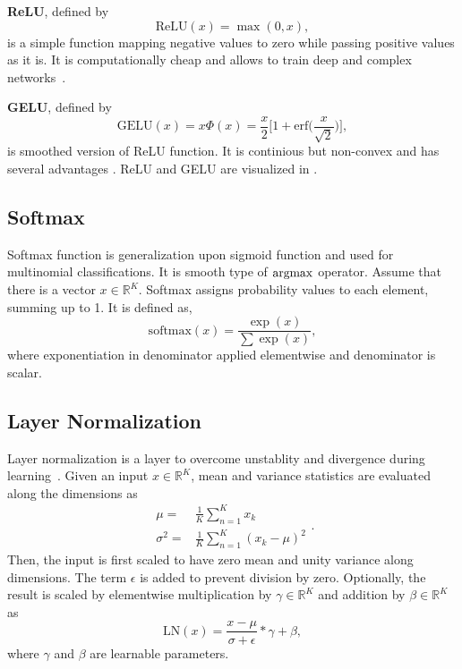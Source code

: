 \textbf{ReLU}, defined by
\begin{equation}
\label{eqn:relu_fcn}
\textrm{ReLU}(x) = \max(0, x),
\end{equation}
is a simple function mapping negative values to zero while passing positive values as it is. It is computationally cheap and allows to train deep and complex networks~\cite{glorot_deep_2011}.

\textbf{GELU}, defined by
\begin{equation}
\label{eqn:gelu_fcn}
\textrm{GELU}(x) = x \Phi(x) = \frac{x}{2} \bigg[ 1 + \textrm{erf} \Big( \frac{x}{\sqrt{2}} \Big) \bigg],
\end{equation}
is smoothed version of ReLU function. It is continious but non-convex and has several advantages \cite{hendrycks_gaussian_2020}. ReLU and GELU are visualized in  . 

\subsection{Softmax}

Softmax function is generalization upon sigmoid function and used for multinomial classifications. It is smooth type of $\operatorname{\textup{argmax}}$ operator. Assume that there is a vector $x \in \mathbb{R}^K$. Softmax assigns probability values to each element, summing up to 1. It is defined as,
\begin{equation}
\label{eqn:softmax_fcn}
\text{softmax}(x) = \frac{\exp(x)}{\sum \exp(x)},
\end{equation}
where exponentiation in denominator applied elementwise and denominator is scalar.

\subsection{Layer Normalization}

Layer normalization is a layer to overcome unstablity and divergence during learning~\cite{ba_layer_2016}. 
Given an input $x \in \mathbb{R}^K$, mean and variance statistics are evaluated along the dimensions as  
\begin{equation}
\label{eq:layernorm_statistics}
\begin{split}
\mu = & \frac{1}{K} \sum_{n=1}^{K} x_k \\
\sigma^2 = & \frac{1}{K} \sum_{n=1}^{K} (x_k-\mu)^2
\end{split}.
\end{equation} 
Then, the input is first scaled to have zero mean and unity variance along dimensions. 
The term $\epsilon$ is added to prevent division by zero. 
Optionally, the result is scaled by elementwise multiplication by $\gamma \in \mathbb{R}^K$ and addition by $\beta \in \mathbb{R}^K$ as
\begin{equation}
\label{eqn:layernorm}
\mathrm{LN}(x) = \frac{x-\mu}{\sigma+\epsilon} * \gamma + \beta,
\end{equation}
where $\gamma$ and $\beta$ are learnable parameters. 
